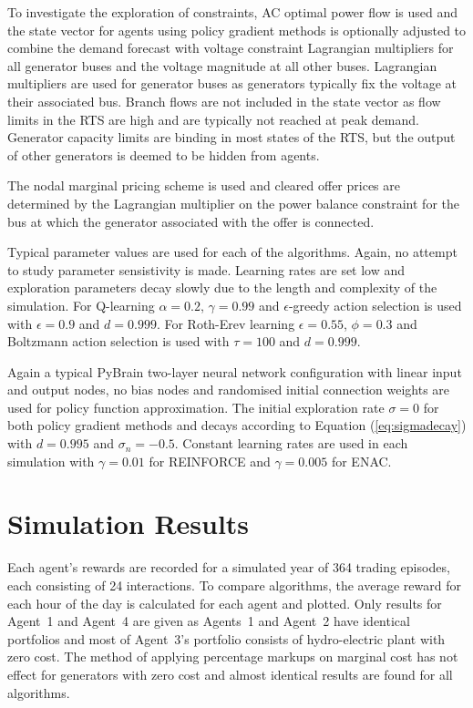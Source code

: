 To investigate the exploration of constraints, AC optimal power flow is used and
the state vector for agents using policy gradient methods is optionally adjusted
to combine the demand forecast with voltage constraint Lagrangian multipliers
for all generator buses and the voltage magnitude at all other buses.
Lagrangian multipliers are used for generator buses as generators typically fix
the voltage at their associated bus.  Branch flows are not included in the state
vector as flow limits in the RTS are high and are typically not reached at
peak demand.  Generator capacity limits are binding in most states of the RTS,
but the output of other generators is deemed to be hidden from agents.

The nodal marginal pricing scheme is used and cleared offer prices are
determined by the Lagrangian multiplier on the power balance constraint for the
bus at which the generator associated with the offer is connected.

Typical parameter values are used for each of the algorithms.  Again, no attempt
to study parameter sensistivity is made.  Learning rates are set low and
exploration parameters decay slowly due to the length and complexity of the
simulation.  For Q-learning $\alpha=0.2$, $\gamma=0.99$ and $\epsilon$-greedy
action selection is used with $\epsilon=0.9$ and $d=0.999$. For Roth-Erev
learning $\epsilon=0.55$, $\phi=0.3$ and Boltzmann action selection is used with
$\tau=100$ and $d=0.999$.

Again a typical PyBrain two-layer neural network configuration with linear input
and output nodes, no bias nodes and randomised initial connection weights are
used for policy function approximation.  The initial exploration rate $\sigma=0$
for both policy gradient methods and decays according to Equation
(\ref{eq:sigmadecay}) with $d=0.995$ and $\sigma_n=-0.5$.  Constant learning
rates are used in each simulation with $\gamma=0.01$ for REINFORCE and
$\gamma=0.005$ for ENAC.

\section{Simulation Results}
Each agent's rewards are recorded for a simulated year of 364 trading episodes,
each consisting of 24 interactions.  To compare algorithms, the average reward
for each hour of the day is calculated for each agent and plotted.  Only results
for Agent~1 and Agent~4 are given as Agents~1 and Agent~2 have identical
portfolios and most of Agent~3's portfolio consists of hydro-electric plant
with zero cost.  The method of applying percentage markups on marginal cost has not
effect for generators with zero cost and almost identical results are found for
all algorithms.


